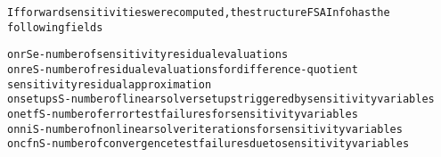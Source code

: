 \begin{alltt}
If forward sensitivities were computed, the structure FSAInfo has the 
following fields

o nrSe      - number of sensitivity residual evaluations
o nreS      - number of residual evaluations for difference-quotient
              sensitivity residual approximation
o nsetupsS  - number of linear solver setups triggered by sensitivity variables
o netfS     - number of error test failures for sensitivity variables
o nniS      - number of nonlinear solver iterations for sensitivity variables
o ncfnS     - number of convergence test failures due to sensitivity variables
\end{alltt}






\vspace{0.1in}